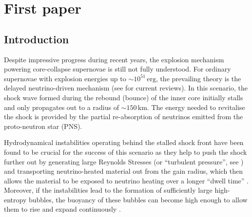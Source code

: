\chapter{First paper} \label{ch:firstpaper}
\section{Introduction}
Despite impressive progress during recent years, the explosion
mechanism powering core-collapse supernovae is still not fully
understood. For ordinary supernovae with explosion energies up to
$\mathord{\sim}10^{51} \,\mathrm{erg}$, the prevailing theory is the
delayed neutrino-driven mechanism (see
\citealp{janka_12,burrows_13} for current reviews). In this scenario,
the shock wave formed during the rebound (bounce) of the inner core
initially stalls and only propagates out to a radius of
$\mathord{\sim}150 \,\mathrm{km}$. The energy needed to revitalise the
shock is provided by the partial re-absorption of neutrinos emitted
from the proto-neutron star (PNS).  

Hydrodynamical instabilities operating behind the stalled shock front
have been found to be crucial for the success of this scenario as they
help to push the shock further out by generating large Reynolds
Stresses (or ``turbulent pressure'', see \citealp{burrows_95,murphy_12,couch_15,mueller_15a})
and transporting neutrino-heated material out from the gain radius, which then
allows the material to be exposed to neutrino heating over a longer
``dwell time'' \citep{buras_06b,murphy_08b}. Moreover, if the
instabilities lead to the formation of sufficiently large high-entropy
bubbles, the buoyancy of these bubbles can become high enough to
allow them to rise and expand continuously
\citep{thompson_00,dolence_13,fernandez_15}. 

